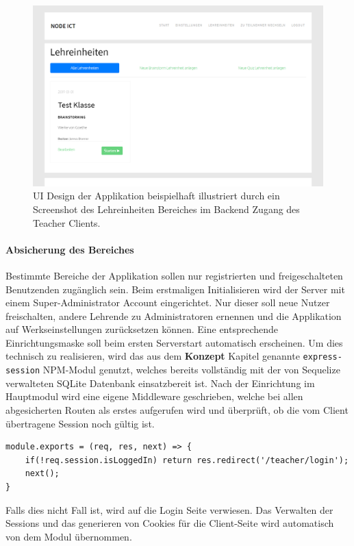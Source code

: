 \begin{figure}[h!]
	\centering
	\includegraphics[width=0.9\linewidth]{bilder/screenshot_lehreinheiten}
	\caption[Screenshot UI Design Lehreinheitenbereich]{UI Design der Applikation beispielhaft illustriert durch ein Screenshot des Lehreinheiten Bereiches im Backend Zugang des Teacher Clients.}
	\label{fig:screenshot_lehreinheiten}
\end{figure}

\paragraph{Absicherung des Bereiches}
Bestimmte Bereiche der Applikation sollen nur registrierten und freigeschalteten Benutzenden zugänglich sein. Beim erstmaligen Initialisieren wird der Server mit einem Super-Administrator Account eingerichtet. Nur dieser soll neue Nutzer freischalten, andere Lehrende zu Administratoren ernennen und die Applikation auf Werkseinstellungen zurücksetzen können. Eine entsprechende Einrichtungsmaske soll beim ersten Serverstart automatisch erscheinen. Um dies technisch zu realisieren, wird das aus dem \textbf{Konzept} Kapitel genannte \texttt{express-session} NPM-Modul genutzt, welches bereits vollständig mit der von Sequelize verwalteten SQLite Datenbank einsatzbereit ist. Nach der Einrichtung im Hauptmodul wird eine eigene Middleware geschrieben, welche bei allen abgesicherten Routen als erstes aufgerufen wird und überprüft, ob die vom Client übertragene Session noch gültig ist.
\begin{lstlisting}[caption=Code der Authentifizierungs Middleware]
module.exports = (req, res, next) => {
	if(!req.session.isLoggedIn) return res.redirect('/teacher/login');
	next();
}
\end{lstlisting}
Falls dies nicht Fall ist, wird auf die Login Seite verwiesen. 
Das Verwalten der Sessions und das generieren von Cookies für die Client-Seite wird automatisch von dem Modul übernommen.
